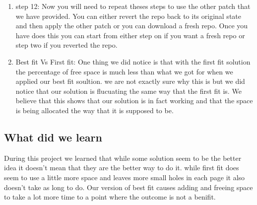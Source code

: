 \documentclass[letterpaper,10pt,titlepage]{article}
\begin{document}
\begin{enumerate}
\item{step 12:}
   Now you will need to repeat theses steps to use the other patch that we have 
   provided. You can either revert the repo back to its original state and then 
   apply the other patch or you can download a fresh repo. Once you have does this 
   you can start from either step on if you want a fresh repo or step two if you 
   reverted the repo.

\item{Best fit Vs First fit: }
   One thing we did notice is that with the first fit solution the percentage of 
   free space is much less than what we got for when we applied our best fit 
   soultion. we are not exactly sure why this is but we did notice that our 
   solution is flucuating the same way that the first fit is. We believe that 
   this shows that our solution is in fact working and that the space is being 
   allocated the way that it is supposed to be.
   
\end{enumerate}
\subsection{What did we learn}
During this project we learned that while some solution seem to be the better 
idea it doesn't mean that they are the better way to do it. while first fit 
does seem to use a little more space and leaves more small holes in each page 
it also doesn't take as long to do. Our version of best fit causes adding and 
freeing space to take a lot more time to a point where the outcome is not a 
benifit. 
\end{document}
